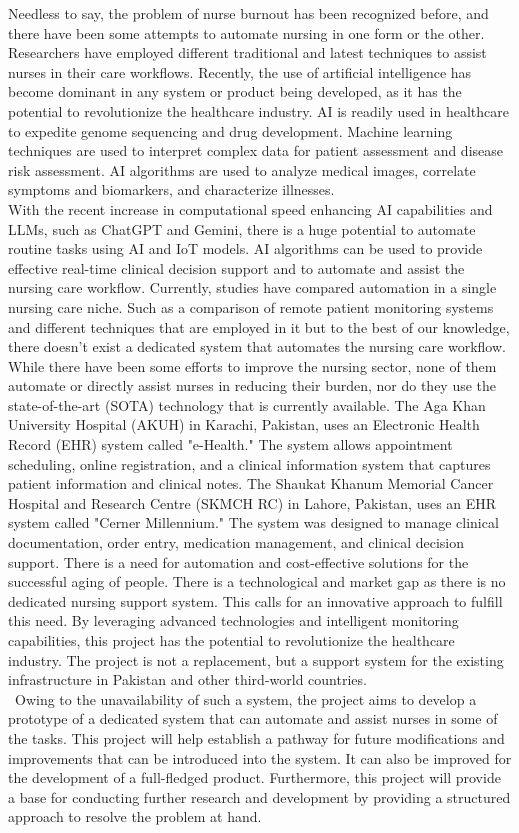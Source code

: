 Needless to say, the problem of nurse burnout has been recognized before, and there have been some attempts to automate nursing in one form or the other. Researchers have employed different traditional and latest techniques to assist nurses in their care workflows. Recently, the use of artificial intelligence has become dominant in any system or product being developed, as it has the potential to revolutionize the healthcare industry. AI is readily used in healthcare to expedite genome sequencing and drug development. Machine learning techniques are used to interpret complex data for patient assessment and disease risk assessment. AI algorithms are used to analyze medical images, correlate symptoms and biomarkers, and characterize illnesses.\\
With the recent increase in computational speed enhancing AI capabilities and LLMs, such as ChatGPT and Gemini, there is a huge potential to automate routine tasks using AI and IoT models. AI algorithms can be used to provide effective real-time clinical decision support and to automate and assist the nursing care workflow.  Currently, studies have compared automation in a single nursing care niche. Such as a comparison of remote patient monitoring systems \cite{rpm} and different techniques that are employed in it but to the best of our knowledge, there doesn't exist a dedicated system that automates the nursing care workflow. While there have been some efforts to improve the nursing sector, none of them automate or directly assist nurses in reducing their burden, nor do they use the state-of-the-art (SOTA) technology that is currently available. The Aga Khan University Hospital (AKUH) in Karachi, Pakistan, uses an Electronic Health Record (EHR) system called "e-Health." The system allows appointment scheduling, online registration, and a clinical information system that captures patient information and clinical notes. The Shaukat Khanum Memorial Cancer Hospital and Research Centre (SKMCH RC) in Lahore, Pakistan, uses an EHR system called "Cerner Millennium." The system was designed to manage clinical documentation, order entry, medication management, and clinical decision support. There is a need for automation and cost-effective solutions for the successful aging of people. There is a technological and market gap as there is no dedicated nursing support system. This calls for an innovative approach to fulfill this need. By leveraging advanced technologies and intelligent monitoring capabilities, this project has the potential to revolutionize the healthcare industry. The project is not a replacement, but a support system for the existing infrastructure in Pakistan and other third-world countries.\\\
Owing to the unavailability of such a system, the project aims to develop a prototype of a dedicated system that can automate and assist nurses in some of the tasks. This project will help establish a pathway for future modifications and improvements that can be introduced into the system. It can also be improved for the development of a full-fledged product. Furthermore, this project will provide a base for conducting further research and development by providing a structured approach to resolve the problem at hand. 

